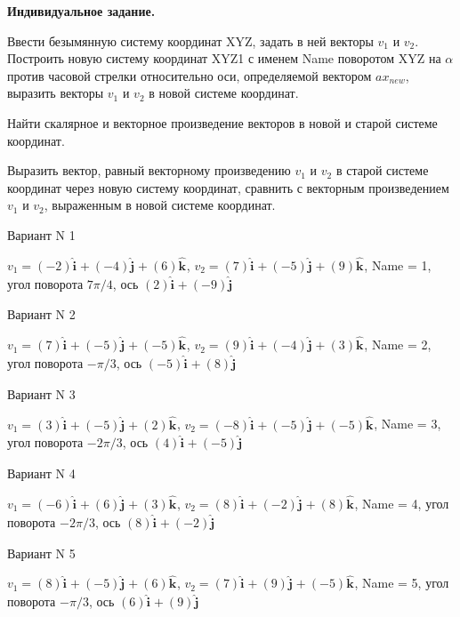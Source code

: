 \documentclass[11pt]{report}
\begin{document}
\pagestyle{empty}

{\bf Индивидуальное задание.}


Ввести безымянную систему координат XYZ, задать в ней векторы $v_1$ и $v_2$. 
Построить новую систему координат XYZ1 с именем Name поворотом  XYZ на $\alpha$ против часовой стрелки относительно оси, 
определяемой вектором $ax_{new}$, выразить векторы $v_1$ и $v_2$ в новой системе координат. 


Найти скалярное и векторное произведение векторов в новой и старой системе координат. 


Выразить вектор, равный векторному произведению $v_1$ и $v_2$ в старой системе координат через новую систему координат, 
сравнить с векторным произведением $v_1$ и $v_2$, выраженным в новой системе координат.

Вариант N 1

$v_1 = (-2)\mathbf{\hat{i}_{}} + (-4)\mathbf{\hat{j}_{}} + (6)\mathbf{\hat{k}_{}}$, $v_2 = (7)\mathbf{\hat{i}_{}} + (-5)\mathbf{\hat{j}_{}} + (9)\mathbf{\hat{k}_{}}$, Name = 1, угол поворота $7 \pi / 4$, ось $(2)\mathbf{\hat{i}_{}} + (-9)\mathbf{\hat{j}_{}}$

Вариант N 2

$v_1 = (7)\mathbf{\hat{i}_{}} + (-5)\mathbf{\hat{j}_{}} + (-5)\mathbf{\hat{k}_{}}$, $v_2 = (9)\mathbf{\hat{i}_{}} + (-4)\mathbf{\hat{j}_{}} + (3)\mathbf{\hat{k}_{}}$, Name = 2, угол поворота $- \pi / 3$, ось $(-5)\mathbf{\hat{i}_{}} + (8)\mathbf{\hat{j}_{}}$

Вариант N 3

$v_1 = (3)\mathbf{\hat{i}_{}} + (-5)\mathbf{\hat{j}_{}} + (2)\mathbf{\hat{k}_{}}$, $v_2 = (-8)\mathbf{\hat{i}_{}} + (-5)\mathbf{\hat{j}_{}} + (-5)\mathbf{\hat{k}_{}}$, Name = 3, угол поворота $- 2 \pi / 3$, ось $(4)\mathbf{\hat{i}_{}} + (-5)\mathbf{\hat{j}_{}}$

Вариант N 4

$v_1 = (-6)\mathbf{\hat{i}_{}} + (6)\mathbf{\hat{j}_{}} + (3)\mathbf{\hat{k}_{}}$, $v_2 = (8)\mathbf{\hat{i}_{}} + (-2)\mathbf{\hat{j}_{}} + (8)\mathbf{\hat{k}_{}}$, Name = 4, угол поворота $- 2 \pi / 3$, ось $(8)\mathbf{\hat{i}_{}} + (-2)\mathbf{\hat{j}_{}}$

Вариант N 5

$v_1 = (8)\mathbf{\hat{i}_{}} + (-5)\mathbf{\hat{j}_{}} + (6)\mathbf{\hat{k}_{}}$, $v_2 = (7)\mathbf{\hat{i}_{}} + (9)\mathbf{\hat{j}_{}} + (-5)\mathbf{\hat{k}_{}}$, Name = 5, угол поворота $- \pi / 3$, ось $(6)\mathbf{\hat{i}_{}} + (9)\mathbf{\hat{j}_{}}$
\end{document}
